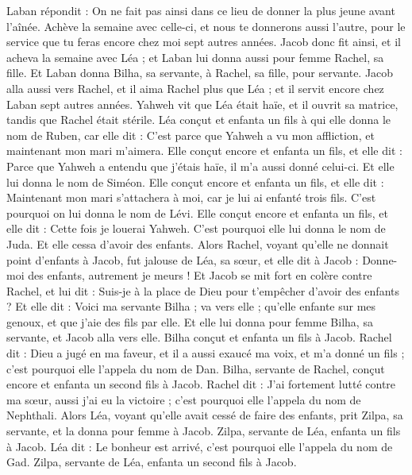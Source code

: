 \begin{multicols}{2}
Laban répondit : On ne fait pas ainsi dans ce lieu de donner la plus jeune avant l'aînée.
Achève la semaine avec celle-ci, et nous te donnerons aussi l'autre, pour le service que tu feras encore chez moi sept autres années.
Jacob donc fit ainsi, et il acheva la semaine avec Léa ; et Laban lui donna aussi pour femme Rachel, sa fille.
Et Laban donna Bilha, sa servante, à Rachel, sa fille, pour servante.
Jacob alla aussi vers Rachel, et il aima Rachel plus que Léa ; et il servit encore chez Laban sept autres années.
Yahweh vit que Léa était haïe, et il ouvrit sa matrice, tandis que Rachel était stérile.
Léa conçut et enfanta un fils à qui elle donna le nom de Ruben, car elle dit : C'est parce que Yahweh a vu mon affliction, et maintenant mon mari m'aimera.
Elle conçut encore et enfanta un fils, et elle dit : Parce que Yahweh a entendu que j'étais haïe, il m'a aussi donné celui-ci. Et elle lui donna le nom de Siméon.
Elle conçut encore et enfanta un fils, et elle dit : Maintenant mon mari s'attachera à moi, car je lui ai enfanté trois fils. C'est pourquoi on lui donna le nom de Lévi.
Elle conçut encore et enfanta un fils, et elle dit : Cette fois je louerai Yahweh. C'est pourquoi elle lui donna le nom de Juda. Et elle cessa d'avoir des enfants.
\VerseOne{}Alors Rachel, voyant qu'elle ne donnait point d'enfants à Jacob, fut jalouse de Léa, sa sœur, et elle dit à Jacob : Donne-moi des enfants, autrement je meurs !
Et Jacob se mit fort en colère contre Rachel, et lui dit : Suis-je à la place de Dieu pour t'empêcher d'avoir des enfants ?
Et elle dit : Voici ma servante Bilha ; va vers elle ; qu'elle enfante sur mes genoux, et que j'aie des fils par elle.
Et elle lui donna pour femme Bilha, sa servante, et Jacob alla vers elle.
Bilha conçut et enfanta un fils à Jacob.
Rachel dit : Dieu a jugé en ma faveur, et il a aussi exaucé ma voix, et m'a donné un fils ; c'est pourquoi elle l'appela du nom de Dan.
Bilha, servante de Rachel, conçut encore et enfanta un second fils à Jacob.
Rachel dit : J'ai fortement lutté contre ma sœur, aussi j'ai eu la victoire ; c'est pourquoi elle l'appela du nom de Nephthali.
Alors Léa, voyant qu'elle avait cessé de faire des enfants, prit Zilpa, sa servante, et la donna pour femme à Jacob.
Zilpa, servante de Léa, enfanta un fils à Jacob.
Léa dit : Le bonheur est arrivé, c'est pourquoi elle l'appela du nom de Gad.
Zilpa, servante de Léa, enfanta un second fils à Jacob.

\end{multicols}
